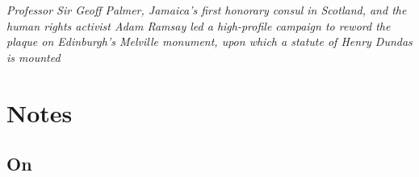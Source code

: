\textit{Professor Sir Geoff Palmer, Jamaica’s first honorary consul in Scotland, and the human rights activist Adam Ramsay led a high-profile campaign to reword the plaque on Edinburgh’s Melville monument, upon which a statute of Henry Dundas is mounted}\cite{mullen_2022}






\section{Notes}

\subsection{On \cite{godard_2018}}

